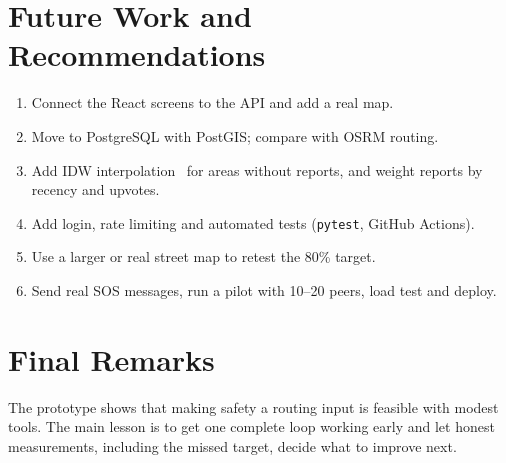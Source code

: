\documentclass{tietreport}
\begin{document}
\section{Future Work and Recommendations}

\begin{enumerate}
  \item Connect the React screens to the API and add a real map.
  \item Move to PostgreSQL with PostGIS; compare with OSRM routing.
  \item Add IDW interpolation~\cite{shepard1968} for areas without
    reports, and weight reports by recency and upvotes.
  \item Add login, rate limiting and automated tests (\texttt{pytest},
    GitHub Actions).
  \item Use a larger or real street map to retest the 80\% target.
  \item Send real SOS messages, run a pilot with 10--20 peers, load test
    and deploy.
\end{enumerate}

\section{Final Remarks}

The prototype shows that making safety a routing input is feasible with
modest tools. The main lesson is to get one complete loop working early
and let honest measurements, including the missed target, decide what to
improve next.

\printbibliography[heading=bibintoc]
\end{document}
